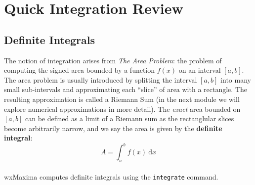 \documentclass[10.5pt,twoside]{report}
\theoremstyle{definition}
\begin{document}
\pagebreak
\section{Quick Integration Review}\label{Quick Integration Review}

\subsection{Definite Integrals}
The notion of integration arises from \textit{The Area Problem}: the problem of computing the signed area bounded by a function $f(x)$ on an interval $[a,b]$.  The area problem is usually introduced by splitting the interval $[a,b]$ into many small sub-intervals and approximating each ``slice'' of area with a rectangle.  The resulting approximation is called a Riemann Sum (in the next module we will explore numerical approximations in more detail).  The \textit{exact} area bounded on $[a,b]$ can be defined as a limit of a Riemann sum as the rectanglular slices become arbitrarily narrow, and we say the area is given by the \textbf{definite integral}: \[A=\displaystyle \int_a^b f(x)\ \mathrm{d}x\]  \\
wxMaxima computes definite integrals using the \verb|integrate| command.\\

${}$\\
\end{document}
